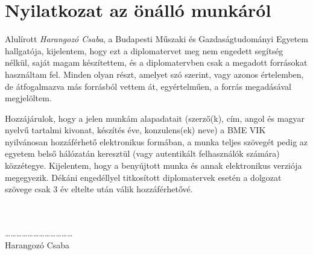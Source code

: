 
\thispagestyle{empty}
\section*{Nyilatkozat az önálló munkáról}

\vfill

\noindent{}Alulírott \emph{Harangozó Csaba}, a Budapesti Műszaki és
Gazdaságtudományi Egyetem hallgatója, kijelentem, hogy ezt a
diplomatervet meg nem engedett segítség nélkül, saját magam
készítettem, és a diplomatervben csak a megadott forrásokat használtam
fel. Minden olyan részt, amelyet szó szerint, vagy azonos értelemben,
de átfogalmazva más forrásból vettem át, egyértelműen, a forrás
megadásával megjelöltem.

Hozzájárulok, hogy a jelen munkám alapadatait (szerző(k), cím, angol és magyar nyelvű tartalmi kivonat, készítés éve, konzulens(ek) neve) a BME VIK nyilvánosan hozzáférhető elektronikus formában, a munka teljes szövegét pedig az egyetem belső hálózatán keresztül (vagy autentikált felhasználók számára) közzétegye. Kijelentem, hogy a benyújtott munka és annak elektronikus verziója megegyezik. Dékáni engedéllyel titkosított diplomatervek esetén a dolgozat szövege csak 3 év eltelte után válik hozzáférhetővé.


\vfill
{}

\begin{multicols}{2}
\begin{center}
  \hspace{1cm}\\
  \hspace{1cm}\\
  \dots\dots\dots\dots\dots\dots\dots\dots\dots\dots\dots\dots\\
  Harangozó Csaba
\end{center}
\end{multicols}